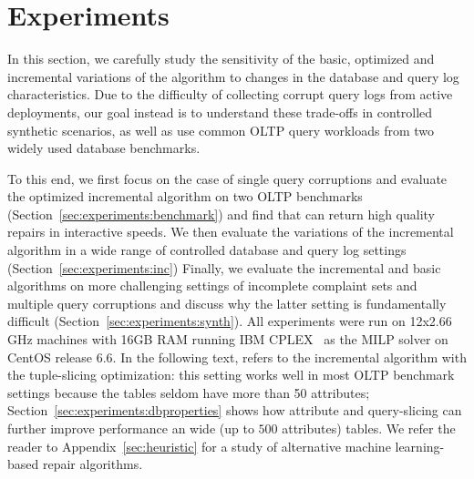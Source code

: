 

\section{Experiments}
\label{sec:experiments}

In this section, we carefully study the sensitivity of the
basic, optimized and incremental variations of the \sys algorithm 
to changes in the database and query log characteristics.
Due to the difficulty of collecting corrupt query logs from active deployments, 
our goal instead is to understand these trade-offs in
controlled synthetic scenarios, as well as use common OLTP query workloads
from two widely used database benchmarks.

To this end, we first focus on the case of single query corruptions and evaluate
the optimized \sys incremental algorithm on two OLTP benchmarks (Section~\ref{sec:experiments:benchmark}) and find that \sys can return high quality repairs in interactive speeds.
We then evaluate the variations of the incremental algorithm in a wide range of controlled database and query log settings (Section~\ref{sec:experiments:inc})
Finally, we evaluate the incremental and basic algorithms on more challenging settings of incomplete complaint sets and multiple query corruptions and discuss why the latter setting is fundamentally difficult (Section~\ref{sec:experiments:synth}).
All experiments were run on 12x2.66 GHz  machines with 16GB RAM running IBM CPLEX~\cite{cplex2014v12} as the MILP solver on CentOS release 6.6.
In the following text, \sys refers to the incremental algorithm with the tuple-slicing optimization: this setting works well in most OLTP benchmark settings because the tables
seldom have more than 50 attributes; Section~\ref{sec:experiments:dbproperties} shows how attribute and query-slicing can further improve performance an wide (up to $500$ attributes) tables.
We refer the reader to Appendix~\ref{sec:heuristic} for a study of alternative machine learning-based repair algorithms.

